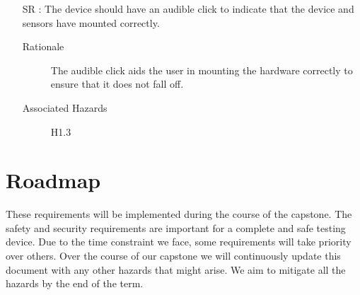 \documentclass{article}
\newcounter{reqnum} %
\begin{document}
\begin{itemize}
  \item[SR \refstepcounter{reqnum}\thereqnum:] The device should have an audible click to indicate that the device and sensors have mounted correctly.
    \begin{description} \item[Rationale] The audible click aids the user in mounting the hardware correctly to ensure that it does not fall off.   \end{description}
    \begin{description} \item[Associated Hazards] H1.3  \end{description}
\end{itemize}


\section{Roadmap}

These requirements will be implemented during the course of the capstone. The safety and security requirements are important for a complete and safe testing device. Due to the time constraint we face, some requirements will take priority over others. Over the course of our capstone we will continuously update this document with any other hazards that might arise. We aim to mitigate all the hazards by the end of the term.
\end{document}
